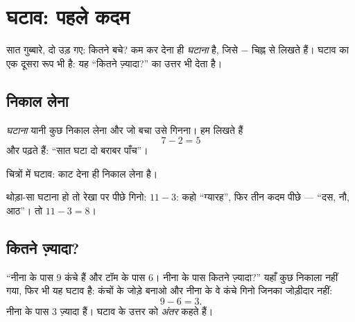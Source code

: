 \chapter{घटाव: पहले कदम}\label{ch:g1:subtraction}

सात गुब्बारे, दो उड़ गए: कितने बचे? कम कर देना ही
\emph{घटाना} है, जिसे $-$ चिह्न से लिखते हैं। घटाव का एक दूसरा
रूप भी है: यह ``कितने ज़्यादा?'' का उत्तर भी देता है।

\section{निकाल लेना}

\begin{definition}[घटाव]\label{def:g1:subtraction:def}
\emph{घटाना} यानी कुछ निकाल लेना और जो बचा उसे गिनना। हम
लिखते हैं
\[
7 - 2 = 5
\]
और पढ़ते हैं: ``सात घटा दो बराबर पाँच''।
\end{definition}

\begin{omfigure}

{\small चित्रों में घटाव: काट देना ही निकाल लेना है।}
\end{omfigure}

\begin{example}[पीछे गिनना]\label{ex:g1:subtraction:countback}
थोड़ा-सा घटाना हो तो रेखा पर पीछे गिनो: $11 - 3$: कहो
``ग्यारह'', फिर तीन कदम पीछे --- ``दस, नौ, आठ''। तो
$11 - 3 = 8$।
\end{example}

\section{कितने ज़्यादा?}

\begin{example}[अंतर]\label{ex:g1:subtraction:difference}
``नीना के पास $9$ कंचे हैं और टॉम के पास $6$। नीना के पास कितने ज़्यादा?''
यहाँ कुछ निकाला नहीं गया, फिर भी यह घटाव है: कंचों के जोड़े बनाओ
और नीना के वे कंचे गिनो जिनका जोड़ीदार नहीं:
\[
9 - 6 = 3 .
\]
नीना के पास $3$ ज़्यादा हैं। घटाव के उत्तर को
\emph{अंतर} कहते हैं।
\end{example}

